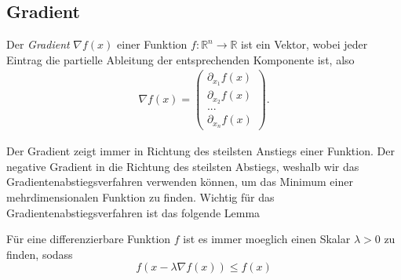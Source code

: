 \subsection{Gradient}
\begin{Def}
Der \emph{Gradient} $\nabla f(x)$ einer Funktion $f:\mathbb{R}^n\rightarrow \mathbb{R}$ ist ein Vektor, wobei jeder Eintrag die partielle Ableitung der entsprechenden Komponente ist, also
\begin{equation*} \begin{split} \nabla f(x) = \left( \begin{array}{c}
\partial_{x_1} f(x) \\
\partial_{x_2} f(x) \\
... \\
\partial_{x_n} f(x)
\end{array}
\right).
\end{split} \end{equation*} 
\end{Def}

Der Gradient zeigt immer in Richtung des steilsten Anstiegs einer Funktion. Der negative Gradient in die Richtung des steilsten Abstiegs, weshalb wir das Gradientenabstiegsverfahren verwenden können, um das Minimum einer mehrdimensionalen Funktion zu finden. Wichtig für das Gradientenabstiegsverfahren ist das folgende Lemma

\begin{Lem}
\label{lem:gradientabstieg}
F\"ur eine differenzierbare Funktion $f$ ist es immer moeglich einen Skalar $\lambda>0$ zu finden, sodass
\begin{equation}
\label{lambda-ungleichung}
f(x - \lambda \nabla f(x)) \leq f(x)
\end{equation} 
\end{Lem}


